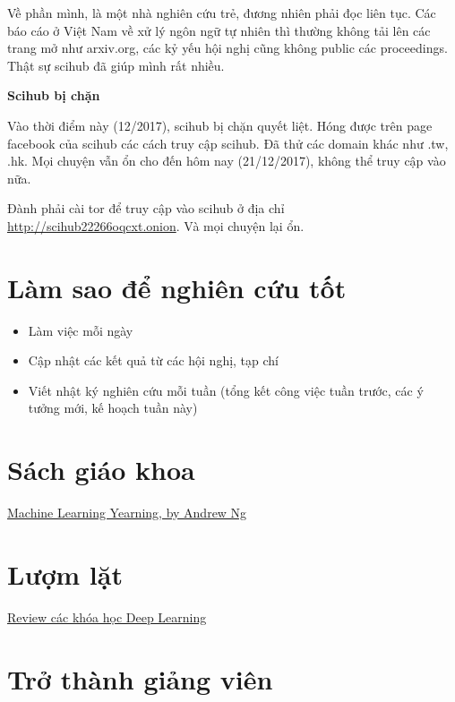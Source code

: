 Về phần mình, là một nhà nghiên cứu trẻ, đương nhiên phải đọc liên tục. Các báo cáo ở Việt Nam về xử lý ngôn ngữ tự nhiên thì thường không tải lên các trang mở như arxiv.org, các kỷ yếu hội nghị cũng không public các proceedings. Thật sự scihub đã giúp mình rất nhiều.

\textbf{Scihub bị chặn}

Vào thời điểm này (12/2017), scihub bị chặn quyết liệt. Hóng được trên page facebook của scihub các cách truy cập scihub. Đã thử các domain khác như .tw, .hk. Mọi chuyện vẫn ổn cho đến hôm nay (21/12/2017), không thể truy cập vào nữa.

Đành phải cài tor để truy cập vào scihub ở địa chỉ \href{http://scihub22266oqcxt.onion/https://dl.acm.org/citation.cfm?id=1852627}{http://scihub22266oqcxt.onion}. Và mọi chuyện lại ổn.

\section{Làm sao để nghiên cứu tốt}

\begin{itemize}
  \item Làm việc mỗi ngày
  \item Cập nhật các kết quả từ các hội nghị, tạp chí
  \item Viết nhật ký nghiên cứu mỗi tuần (tổng kết công việc tuần trước, các ý tưởng mới, kế hoạch tuần này)
\end{itemize}

\section{Sách giáo khoa}

\href{https://gallery.mailchimp.com/dc3a7ef4d750c0abfc19202a3/files/Machine_Learning_Yearning_V0.5_01.pdf}{Machine Learning Yearning, by Andrew Ng}

\section{Lượm lặt}

\href{https://www.kdnuggets.com/2017/10/3-popular-courses-deep-learning.html}{Review các khóa học Deep Learning}

\section{Trở thành giảng viên}



